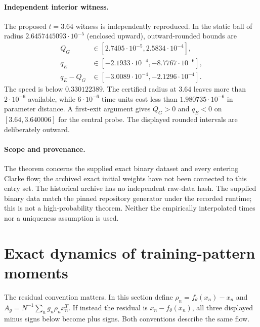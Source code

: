 \documentclass[10pt]{article}
\begin{document}
\paragraph{Independent interior witness.}
The proposed $t=3.64$ witness is independently reproduced. In the static
ball of radius $2.6457445093\cdot10^{-5}$ (enclosed upward), outward-rounded
bounds are
\begin{align*}
 Q_G&\in[2.7405\cdot10^{-5},2.5834\cdot10^{-4}],\\
 q_E&\in[-2.1933\cdot10^{-4},-8.7767\cdot10^{-6}],\\
 q_E-Q_G&\in[-3.0089\cdot10^{-4},-2.1296\cdot10^{-4}].
\end{align*}
The speed is below $0.330122389$. The certified radius at $3.64$ leaves
more than $2\cdot10^{-6}$ available, while $6\cdot10^{-6}$ time units cost
less than $1.980735\cdot10^{-6}$ in parameter distance. A first-exit
argument gives $Q_G>0$ and $q_E<0$ on $[3.64,3.640006]$ for the central
probe. The displayed rounded intervals are deliberately outward.

\paragraph{Scope and provenance.}
The theorem concerns the supplied exact binary dataset and every entering
Clarke flow; the archived exact initial weights have not been connected to
this entry set. The historical archive has no independent raw-data hash.
The supplied binary data match the pinned repository generator under the
recorded runtime; this is not a high-probability theorem. Neither the
empirically interpolated times nor a uniqueness assumption is used.

\section{Exact dynamics of training-pattern moments}
\label{sec:pattern-quotient}
The residual convention matters. In this section define
$\rho_n=f_\theta(x_n)-x_n$ and
$A_g=N^{-1}\sum_n g_n\rho_nx_n^T$.
If instead the residual is $x_n-f_\theta(x_n)$, all three displayed minus
signs below become plus signs. Both conventions describe the same flow.
\end{document}
